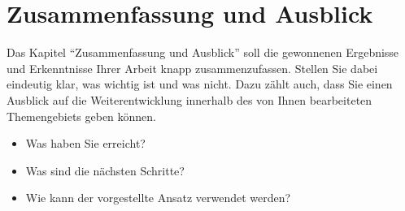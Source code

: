 %
\section{Zusammenfassung und Ausblick}
\label{sec_conclusion}

Das Kapitel "`Zusammenfassung und Ausblick"' soll die gewonnenen Ergebnisse und Erkenntnisse Ihrer Arbeit knapp zusammenzufassen.
Stellen Sie dabei eindeutig klar, was wichtig ist und was nicht.
Dazu zählt auch, dass Sie einen Ausblick auf die Weiterentwicklung innerhalb des von Ihnen bearbeiteten Themengebiets geben können.
\begin{itemize}
\item Was haben Sie erreicht?
\item Was sind die nächsten Schritte?
\item Wie kann der vorgestellte Ansatz verwendet werden?
\end{itemize}
